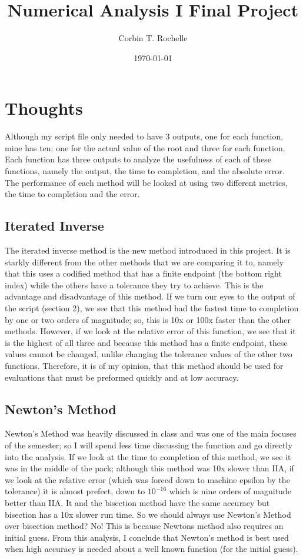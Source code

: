 \documentclass[12pt]{article}
\author{Corbin T. Rochelle}
\title{Numerical Analysis I Final Project}
\date{\today}
\begin{document}
\maketitle

\section{Thoughts}
Although my script file only needed to have 3 outputs, one for each function, mine has ten: one for the actual value of the root and three for each function.
Each function has three outputs to analyze the usefulness of each of these functions, namely the output, the time to completion, and the absolute error.
The performance of each method will be looked at using two different metrics, the time to completion and the error.

\subsection{Iterated Inverse}
The iterated inverse method is the new method introduced in this project.
It is starkly different from the other methods that we are comparing it to, namely that this uses a codified method that has a finite endpoint (the bottom right index) while the others have a tolerance they try to achieve.
This is the advantage and disadvantage of this method.
If we turn our eyes to the output of the script (section 2), we see that this method had the fastest time to completion by one or two orders of magnitude; 
so, this is 10x or 100x faster than the other methods. 
However, if we look at the relative error of this function, we see that it is the highest of all three and because this method has a finite endpoint, these values cannot be changed, unlike changing the tolerance values of the other two functions. 
Therefore, it is of my opinion, that this method should be used for evaluations that must be preformed quickly and at low accuracy. 

\subsection{Newton's Method}
Newton's Method was heavily discussed in class and was one of the main focuses of the semester; so I will spend less time discussing the function and go directly into the analysis.
If we look at the time to completion of this method, we see it was in the middle of the pack; 
although this method was 10x slower than IIA, if we look at the relative error (which was forced down to machine epsilon by the tolerance) it is almost prefect, down to $10^{-16}$ which is nine orders of magnitude better than IIA.
It and the bisection method have the same accuracy but bisection has a 10x slower run time.
So we should always use Newton's Method over bisection method?
No! This is because Newtons method also requires an initial guess.
From this analysis, I conclude that Newton's method is best used when high accuracy is needed about a well known function (for the initial guess).
\end{document}
